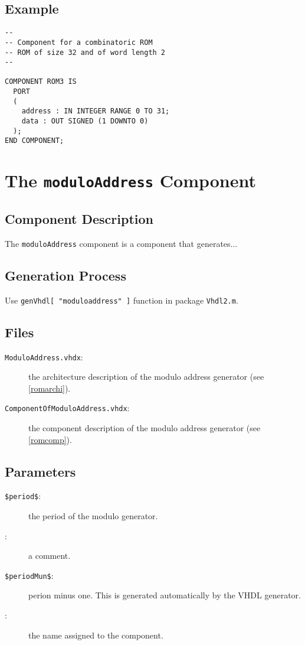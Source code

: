 \documentclass[11pt]{article}
\begin{document}
\subsection{Example}

\begin{verbatim}
--
-- Component for a combinatoric ROM
-- ROM of size 32 and of word length 2
--

COMPONENT ROM3 IS
  PORT 
  (
    address : IN INTEGER RANGE 0 TO 31;
    data : OUT SIGNED (1 DOWNTO 0)
  );
END COMPONENT;
\end{verbatim}

\newcommand{\moduloaddress}{\texttt{moduloAddress}}
\section{The \moduloaddress{} Component}

\subsection{Component Description}
The \moduloaddress{} component is a component that generates...

\subsection{Generation Process}
Use \texttt{genVhdl[ "moduloaddress" ]} function in package \texttt{Vhdl2.m}.

\subsection{Files}
\begin{description}
\item[\texttt{ModuloAddress.vhdx}:] the architecture description of the modulo address generator (see \ref{romarchi}).
\item[\texttt{ComponentOfModuloAddress.vhdx}:] the component description of the modulo address generator (see \ref{romcomp}).
\end{description}

\newcommand{\periodparam}{\texttt{\$period\$}}
\newcommand{\periodmunparam}{\texttt{\$periodMun\$}}

\subsection{Parameters}
\begin{description}
\item[\periodparam{}: ] the period of the modulo generator.
\item[\commentparam{}: ] a comment.
\item[\periodmunparam{}: ] perion minus one. This is generated automatically by the
VHDL generator.
\item[\nameparam{}: ] the name assigned to the component.
\end{description}
\end{document}
